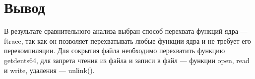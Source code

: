 
	



\section*{Вывод}

В результате сравнительного анализа выбран способ перехвата функций ядра --- ftrace, так как он позволяет перехватывать любые функции ядра и не требует его перекомпиляции.
Для сокрытия файла необходимо перехватить функцию getdents64, для запрета чтения из файла и записи в файл --- функции open, read и write, удаления --- unlink().